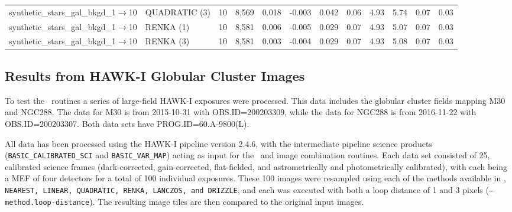 \begin{table}
\begin{center}
\begin{tabular}{|l|l|c|c|c|c|c|c|c|c|c|c|}
synthetic\_stars\_gal\_bkgd\_1$\to$10   	& QUADRATIC (3) &10  			&  8,569	& 0.018       & -0.003  	& 0.042  & 0.06 	& 4.93  & 5.74  			& 0.07   & 0.03  \\
synthetic\_stars\_gal\_bkgd\_1$\to$10   	& RENKA (1)          &10 	   		&  8,581 	& 0.006       & -0.005  	& 0.029  & 0.07 	& 4.93  & 5.07  			& 0.07   & 0.03  \\
synthetic\_stars\_gal\_bkgd\_1$\to$10   	& RENKA (3)          &10	   		&  8,581 	& 0.003       & -0.004  	& 0.029  & 0.07 	& 4.93  & 5.08  			& 0.07   & 0.03  \\
\bottomrule


\end{tabular}	
\end{center}																											

\label{tab:compare_synthetic}
\end{table}

\normalsize

\subsection{Results from HAWK-I Globular Cluster Images}
\label{sect:hawki1}


To test the \hdrlresample\ routines a series of large-field HAWK-I exposures were processed.  
This data includes the globular cluster fields mapping M30 and NGC288.
The data for M30 is from 2015-10-31 with OBS.ID=200203309, while the data for NGC288 is from 2016-11-22 with OBS.ID=200203307.
Both data sets have PROG.ID=60.A-9800(L).

All data has been processed using the HAWK-I pipeline version 2.4.6, with the intermediate pipeline science products 
({\tt BASIC\_CALIBRATED\_SCI} and {\tt BASIC\_VAR\_MAP}) acting as input for the \hdrlint\  and image combination routines.
Each data set consisted of 25, calibrated science frames (dark-corrected, gain-corrected, flat-fielded, and astrometrically and photometrically calibrated), with each being a MEF
of four detectors for a total of 100 individual exposures.
These 100 images were resampled using each of the methods available in \hdrlresample, {\tt NEAREST, LINEAR, QUADRATIC, RENKA, LANCZOS,
and DRIZZLE}, and each was executed with both a loop distance of 1 and 3 pixels ({\tt --method.loop-distance}).
The resulting image tiles are then compared to the original input images.

